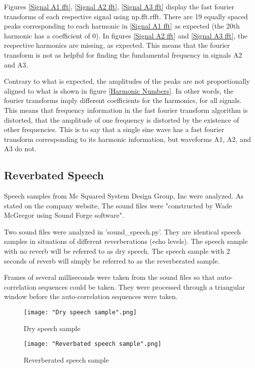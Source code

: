 \documentclass[12pt]{article}
\begin{document}
Figures \ref{Signal A1 fft}, \ref{Signal A2 fft}, \ref{Signal A3 fft} display the fast fourier transforms of each respective signal using np.fft.rfft. There are 19 equally spaced peaks corresponding to each harmonic in \ref{Signal A1 fft} as expected (the 20th harmonic has a coefficient of 0). In figures \ref{Signal A2 fft} and \ref{Signal A3 fft}, the respective harmonics are missing, as expected. This means that the fourier transform is not as helpful for finding the fundamental frequency in signals A2 and A3.\newline

Contrary to what is expected, the amplitudes of the peaks are not proportionally aligned to what is shown in figure \ref{Harmonic Numbers}. In other words, the fourier transforms imply different coefficients for the harmonics, for all signals. This means that frequency information in the fast fourier transform algorithm is distorted, that the amplitude of one frequency is distorted by the existence of other frequencies. This is to say that a single sine wave has a fast fourier transform corresponding to its harmonic information, but waveforms A1, A2, and A3 do not.

\subsection{Reverbated Speech}

Speech samples from Mc Squared System Design Group, Inc were analyzed\cite{ac}. As stated on the company website, The sound files were "constructed by Wade McGregor using Sound Forge software"\cite{ac}.\newline

Two sound files were analyzed in 'sound\_speech.py'. They are identical speech samples
in situations of different reverberations (echo levels). The speech sample with no reverb will be referred to as dry speech. The speech sample with 2 seconds of reverb will simply be referred to as the reverberated sample.\newline

Frames of several milliseconds were taken from the sound files so that auto-correlation sequences could be taken. They were processed through a triangular window before the auto-correlation sequences were taken.

\begin{figure}[H]
	\texttt{[image: "Dry speech sample".png]}
	\caption{Dry speech sample}\label{Dry speech sample}
	\endminipage\hfill
	\texttt{[image: "Reverbated speech sample".png]}
	\caption{Reverberated speech sample}\label{Reverbated speech sample}
	\endminipage\hfill
\end{figure}
\end{document}
